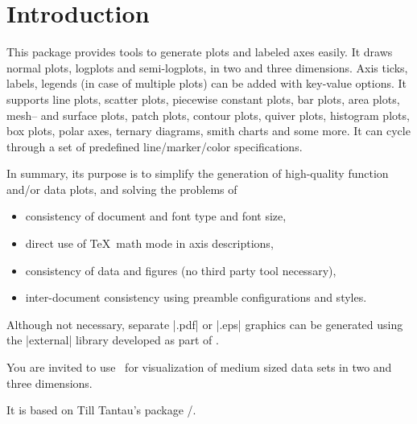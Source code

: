 \chapter{Introduction}
This package provides tools to generate plots and labeled axes easily. It draws normal plots, logplots and semi-logplots, in two and three dimensions. Axis ticks, labels, legends (in case of multiple plots) can be added with key-value options. It supports line plots, scatter plots, piecewise constant plots, bar plots, area plots, mesh-- and surface plots, patch plots, contour plots, quiver plots, histogram plots, box plots, polar axes, ternary diagrams, smith charts and some more. 
It can cycle through a set of predefined line/marker/color specifications. 

In summary, its purpose is to simplify the generation of high-quality function and/or data plots, and solving the problems of
\begin{itemize}
	\item consistency of document and font type and font size,
	\item direct use of \TeX\ math mode in axis descriptions,
	\item consistency of data and figures (no third party tool necessary),
	\item inter-document consistency using preamble configurations and styles.
\end{itemize}
Although not necessary, separate |.pdf| or |.eps| graphics can be generated using the |external| library developed as part of \Tikz.

You are invited to use \PGFPlots\ for visualization of medium sized data sets in two and three dimensions.

It is based on Till Tantau's package \PGF/\Tikz.
